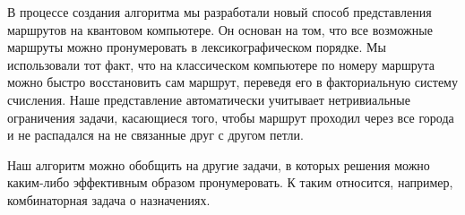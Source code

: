 В процессе создания алгоритма мы разработали новый способ представления маршрутов на квантовом компьютере.
Он основан на том, что все возможные маршруты можно пронумеровать в лексикографическом порядке.
Мы использовали тот факт, что на классическом компьютере по номеру маршрута можно быстро восстановить сам маршрут, переведя его в факториальную систему счисления.
Наше представление автоматически учитывает нетривиальные ограничения задачи, касающиеся того, чтобы маршрут проходил через все города и не распадался на не связанные друг с другом петли.

Наш алгоритм можно обобщить на другие задачи, в которых решения можно каким-либо эффективным образом пронумеровать. К таким относится, например, комбинаторная задача о назначениях.








\sloppy
\showbib


 
